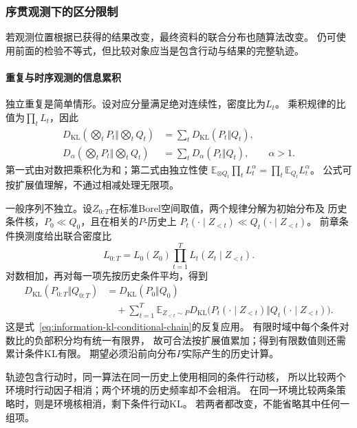\subsubsection{序贯观测下的区分限制}
\label{sec:information-sequential-observations}

若观测位置根据已获得的结果改变，最终资料的联合分布也随算法改变。
仍可使用前面的检验不等式，但比较对象应当是包含行动与结果的完整轨迹。

\paragraph{重复与时序观测的信息累积}
\label{sec:information-sequential-accumulation}

独立重复是简单情形。设对应分量满足绝对连续性，密度比为\(L_t\)。
乘积规律的比值为\(\prod_tL_t\)，因此
\[
\begin{aligned}
  D_{\mathrm{KL}}\left(\bigotimes_tP_t\Big\Vert\bigotimes_tQ_t\right)
     &=\sum_tD_{\mathrm{KL}}(P_t\Vert Q_t),\\
  D_\alpha\left(\bigotimes_tP_t\Big\Vert\bigotimes_tQ_t\right)
     &=\sum_tD_\alpha(P_t\Vert Q_t),\qquad\alpha>1.
\end{aligned}
\]
第一式由对数把乘积化为和；第二式由独立性使
\(\mathbb E_{\otimes Q_t}\prod_tL_t^\alpha=\prod_t\mathbb E_{Q_t}L_t^\alpha\)。
公式可按扩展值理解，不通过相减处理无限项。

一般序列不独立。设\(Z_{0:T}\)在标准Borel空间取值，两个规律分解为初始分布及
历史条件核，\(P_0\ll Q_0\)，且在相关的\(P\)-历史上
\(P_t(\cdot\mid Z_{<t})\ll Q_t(\cdot\mid Z_{<t})\)。
前章条件换测度给出联合密度比
\[
  L_{0:T}=L_0(Z_0)\prod_{t=1}^T L_t(Z_t\mid Z_{<t}).
\]
对数相加，再对每一项先按历史条件平均，得到
\begin{equation}
\begin{aligned}
 D_{\mathrm{KL}}(P_{0:T}\Vert Q_{0:T})
 &=D_{\mathrm{KL}}(P_0\Vert Q_0)\\
 &\quad+\sum_{t=1}^T\mathbb E_{Z_{<t}\sim P}
 D_{\mathrm{KL}}\bigl(P_t(\cdot\mid Z_{<t})
                     \Vert Q_t(\cdot\mid Z_{<t})\bigr).
\end{aligned}
\label{eq:information-trajectory-kl-chain}
\end{equation}
这是式~\eqref{eq:information-kl-conditional-chain}的反复应用。
有限时域中每个条件对数比的负部积分均有统一有限界，
故可合法按扩展值累加；得到有限数值则还需累计条件KL有限。
期望必须沿前向分布\(P\)实际产生的历史计算。

轨迹包含行动时，同一算法在同一历史上使用相同的条件行动核，
所以比较两个环境时行动因子相消；两个环境的历史频率却不会相消。
在同一环境比较两条策略时，则是环境核相消，剩下条件行动KL。
若两者都改变，不能省略其中任何一组项。

